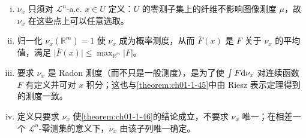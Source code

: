 \documentclass[../../main.tex]{subfiles}%
\begin{document}
\begin{remark}\label{remark:ch01-def-1-34-b-b}
\begin{enumerate}[(i)]
\item $\nu_x$ 只须对 $\mathcal{L}^n$-a.e. $x\in U$ 定义：$U$ 的零测子集上的纤维不影响图像测度 $\mu$，故 $\nu_x$ 在这些点上可以任意选取。
\item 归一化 $\nu_x(\mathbb{R}^m)=1$ 使 $\nu_x$ 成为概率测度，从而 $\bar F(x)$ 是 $F$ 关于 $\nu_x$ 的平均值，满足 $\lvert\bar F(x)\rvert\leqslant\max_{\mathbb{R}^m}\lvert F\rvert$。
\item 要求 $\nu_x$ 是 Radon 测度（而不只是一般测度），是为了使 $\int F\mathrm{d}\nu_x$ 对连续函数 $F$ 有定义并可对 $x$ 积分；这也与\cref{theorem:ch01-1-45}中由 Riesz 表示定理得到的测度一致。%
\item 定义只要求 $\nu_x$ 使\cref{theorem:ch01-1-46}的结论成立，不要求 $\nu_x$ 唯一；在相差一个 $\mathcal{L}^n$-零测集的意义下，$\nu_x$ 由该子列唯一确定。%
\end{enumerate}
\end{remark}
\end{document}
